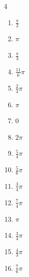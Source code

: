 \begin{multicols}{4}
\begin{enumerate}
  \item $\displaystyle \frac{\pi}{2}$

  \item $\displaystyle \pi$

  \item $\displaystyle \frac{\pi}{3}$

  \item $\displaystyle \frac{11}{6}\pi$

  \item $\displaystyle \frac{2}{3}\pi$

\columnbreak %

\resetques

  \item $\displaystyle \pi$

  \item $\displaystyle 0$

  \item $\displaystyle 2\pi$

  \item $\displaystyle \frac{5}{4}\pi$

  \item $\displaystyle \frac{5}{6}\pi$

  \item $\displaystyle \frac{3}{4}\pi$

  \item $\displaystyle \frac{7}{4}\pi$

  \item $\displaystyle \pi$

  \item $\displaystyle \frac{3}{4}\pi$

  \item $\displaystyle \frac{4}{3}\pi$

  \item $\displaystyle \frac{7}{6}\pi$


\end{enumerate}
\end{multicols}
